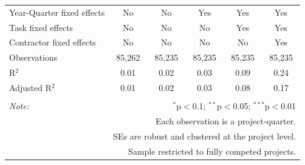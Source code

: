 \documentclass[]{article}
\begin{document}
\begin{table}[H]
\begin{tabular}{@{\extracolsep{-2pt}}lccccc}
Year-Quarter fixed effects & No & No & Yes & Yes & Yes \\ 
Task fixed effects & No & No & No & Yes & Yes \\ 
Contractor fixed effects & No & No & No & No & Yes \\ 
Observations & 85,262 & 85,235 & 85,235 & 85,235 & 85,235 \\ 
R$^{2}$ & 0.01 & 0.02 & 0.03 & 0.09 & 0.24 \\ 
Adjusted R$^{2}$ & 0.01 & 0.02 & 0.03 & 0.08 & 0.17 \\ 
\hline 
\hline \\[-1.8ex] 
\textit{Note:}  & \multicolumn{5}{r}{$^{*}$p$<$0.1; $^{**}$p$<$0.05; $^{***}$p$<$0.01} \\ 
 & \multicolumn{5}{r}{Each observation is a project-quarter.} \\ 
 & \multicolumn{5}{r}{SEs are robust and clustered at the project level.} \\ 
 & \multicolumn{5}{r}{Sample restricted to fully competed projects.} \\ 
\end{tabular} 
\end{table}
\end{document}
